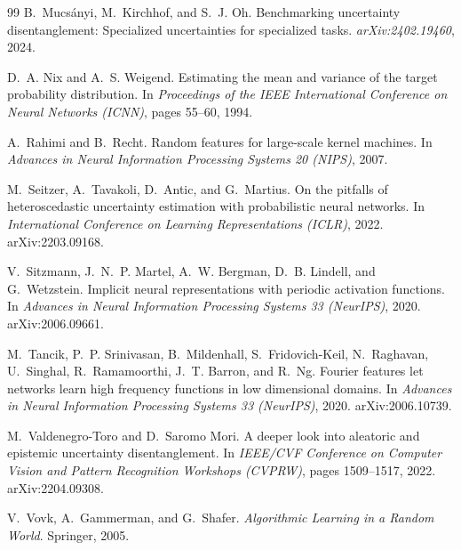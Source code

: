 \documentclass[10pt]{article}
\begin{document}
\begin{thebibliography}{99}
B.~Mucs\'anyi, M.~Kirchhof, and S.~J. Oh.
\newblock Benchmarking uncertainty disentanglement: Specialized uncertainties for specialized
tasks.
\newblock \emph{arXiv:2402.19460}, 2024.

D.~A. Nix and A.~S. Weigend.
\newblock Estimating the mean and variance of the target probability distribution.
\newblock In \emph{Proceedings of the IEEE International Conference on Neural Networks
(ICNN)}, pages 55--60, 1994.

A.~Rahimi and B.~Recht.
\newblock Random features for large-scale kernel machines.
\newblock In \emph{Advances in Neural Information Processing Systems 20 (NIPS)}, 2007.

M.~Seitzer, A.~Tavakoli, D.~Antic, and G.~Martius.
\newblock On the pitfalls of heteroscedastic uncertainty estimation with probabilistic neural
networks.
\newblock In \emph{International Conference on Learning Representations (ICLR)}, 2022.
arXiv:2203.09168.

V.~Sitzmann, J.~N.~P. Martel, A.~W. Bergman, D.~B. Lindell, and G.~Wetzstein.
\newblock Implicit neural representations with periodic activation functions.
\newblock In \emph{Advances in Neural Information Processing Systems 33 (NeurIPS)}, 2020.
arXiv:2006.09661.

M.~Tancik, P.~P. Srinivasan, B.~Mildenhall, S.~Fridovich-Keil, N.~Raghavan, U.~Singhal,
R.~Ramamoorthi, J.~T. Barron, and R.~Ng.
\newblock Fourier features let networks learn high frequency functions in low dimensional
domains.
\newblock In \emph{Advances in Neural Information Processing Systems 33 (NeurIPS)}, 2020.
arXiv:2006.10739.

M.~Valdenegro-Toro and D.~Saromo Mori.
\newblock A deeper look into aleatoric and epistemic uncertainty disentanglement.
\newblock In \emph{IEEE/CVF Conference on Computer Vision and Pattern Recognition Workshops
(CVPRW)}, pages 1509--1517, 2022. arXiv:2204.09308.

V.~Vovk, A.~Gammerman, and G.~Shafer.
\newblock \emph{Algorithmic Learning in a Random World}.
\newblock Springer, 2005.

\end{thebibliography}
\end{document}
